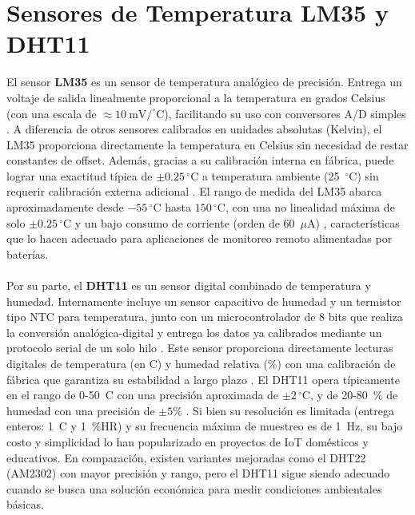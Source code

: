 \section{Sensores de Temperatura LM35 y DHT11}
El sensor \textbf{LM35} es un sensor de temperatura analógico de precisión. Entrega un voltaje de salida linealmente proporcional a la temperatura en grados Celsius (con una escala de $\approx 10~\mathrm{mV}/^\circ\mathrm{C}$), facilitando su uso con conversores A/D simples \cite{TI-LM35}. A diferencia de otros sensores calibrados en unidades absolutas (Kelvin), el LM35 proporciona directamente la temperatura en Celsius sin necesidad de restar constantes de offset. Además, gracias a su calibración interna en fábrica, puede lograr una exactitud típica de $\pm 0.25\,^\circ\mathrm{C}$ a temperatura ambiente (25~$^\circ$C) sin requerir calibración externa adicional \cite{TI-LM35}. El rango de medida del LM35 abarca aproximadamente desde $-55\,^\circ\mathrm{C}$ hasta $150\,^\circ\mathrm{C}$, con una no linealidad máxima de solo $\pm 0.25\,^\circ\mathrm{C}$ y un bajo consumo de corriente (orden de 60~$\mu$A) \cite{TI-LM35}, características que lo hacen adecuado para aplicaciones de monitoreo remoto alimentadas por baterías.
\\\\
Por su parte, el \textbf{DHT11} es un sensor digital combinado de temperatura y humedad. Internamente incluye un sensor capacitivo de humedad y un termistor tipo NTC para temperatura, junto con un microcontrolador de 8 bits que realiza la conversión analógica-digital y entrega los datos ya calibrados mediante un protocolo serial de un solo hilo \cite{Aosong-DHT11}.  Este sensor proporciona directamente lecturas digitales de temperatura (en C) y humedad relativa (\%) con una calibración de fábrica que garantiza su estabilidad a largo plazo \cite{Aosong-DHT11}. El DHT11 opera típicamente en el rango de 0-50~C con una precisión aproximada de 
$\pm 2\,^\circ\mathrm{C}$, y de 20-80~\% de humedad con una precisión de $\pm 5\%$ \cite{Aosong-DHT11}. Si bien su resolución es limitada (entrega enteros: 1~C y 1~\%HR) y su frecuencia máxima de muestreo es de 1~Hz, su bajo costo y simplicidad lo han popularizado en proyectos de IoT domésticos y educativos. En comparación, existen variantes mejoradas como el DHT22 (AM2302) con mayor precisión y rango, pero el DHT11 sigue siendo adecuado cuando se busca una solución económica para medir condiciones ambientales básicas.
